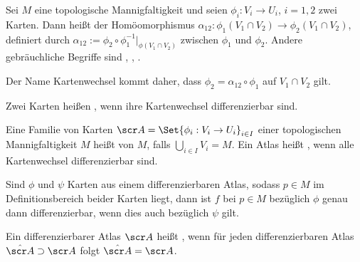 \begin{df} \label{1.6}
    Sei $M$ eine topologische Mannigfaltigkeit und seien $\phi_i: V_i \to U_i$, $i = 1, 2$ zwei Karten.
    Dann heißt der Homöomorphismus $\alpha_{12}: \phi_1(V_1 \cap V_2) \to \phi_2(V_1 \cap V_2)$, definiert durch
    \begin{math}
        \alpha_{12} := \phi_2 \circ \phi_1^{-1}|_{\phi(V_1 \cap V_2)}
    \end{math}
     zwischen $\phi_1$ und $\phi_2$.
    Andere gebräuchliche Begriffe sind , , .
    \begin{note}
        Der Name Kartenwechsel kommt daher, dass $\phi_2 = \alpha_{12} \circ \phi_1$ auf $V_1 \cap V_2$ gilt.
    \end{note}
    Zwei Karten heißen , wenn ihre Kartenwechsel differenzierbar sind.

    Eine Familie von Karten $\scr A = \Set{\phi_i: V_i \to U_i}_{i \in I}$ einer topologischen Mannigfaltigkeit $M$ heißt  von $M$, falls $\bigcup_{i \in I} V_i = M$.
    Ein Atlas heißt , wenn alle Kartenwechsel differenzierbar sind.
    \begin{note}
        Sind $\phi$ und $\psi$ Karten aus einem differenzierbaren Atlas, sodass $p \in M$ im Definitionsbereich beider Karten liegt, dann ist $f$ bei $p \in M$ bezüglich $\phi$ genau dann differenzierbar, wenn dies auch bezüglich $\psi$ gilt.
    \end{note}
    Ein differenzierbarer Atlas $\scr A$ heißt , wenn für jeden differenzierbaren Atlas $\hat{\scr A} \supset \scr A$ folgt $\hat{\scr A} = \scr A$.
\end{df}


